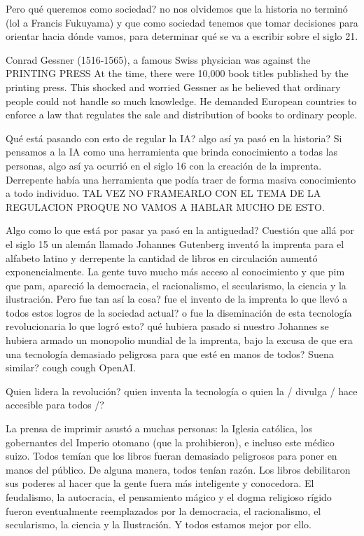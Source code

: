 Pero qué queremos como sociedad? no nos olvidemos que la historia no terminó (lol a Francis Fukuyama) y que como sociedad
tenemos que tomar decisiones para orientar hacia dónde vamos, para determinar qué se va a escribir sobre el siglo 21. 

Conrad Gessner (1516-1565), a famous Swiss physician was against the PRINTING PRESS At the time, there were 10,000 book titles published by the printing press.
This shocked and worried Gessner as he believed that ordinary people could not handle so much knowledge. 
He demanded European countries to enforce a law that regulates the sale and distribution of books to ordinary people. 


Qué está pasando con esto de regular la IA? algo así ya pasó en la historia?
Si pensamos a la IA como una herramienta que brinda conocimiento a todas las personas, algo así ya ocurrió en el siglo 16 con la 
creación de la imprenta. Derrepente había una herramienta que podía traer de forma masiva conocimiento a todo individuo. 
TAL VEZ NO FRAMEARLO CON EL TEMA DE LA REGULACION PROQUE NO VAMOS A HABLAR MUCHO DE ESTO. 

Algo como lo que está por pasar ya pasó en la antiguedad?
Cuestión que allá por el siglo 15 un alemán llamado Johannes Gutenberg inventó la imprenta para el alfabeto latino y derrepente la cantidad de libros
en circulación aumentó exponencialmente. La gente tuvo mucho más acceso al conocimiento y que pim que pam, 
apareció la democracia, el racionalismo, el secularismo, la ciencia y la ilustración. 
Pero fue tan así la cosa? fue el invento de la imprenta lo que llevó a todos estos logros de la sociedad actual?
o fue la diseminación de esta tecnología revolucionaria lo que logró esto? qué hubiera pasado si nuestro Johannes
se hubiera armado un monopolio mundial de la imprenta, bajo la excusa de que era una tecnología demasiado peligrosa
para que esté en manos de todos?
Suena similar? cough cough OpenAI. 


Quien lidera la revolución? quien inventa la tecnología o quien la / divulga / hace accesible para todos /?



La prensa de imprimir asustó a muchas personas: la Iglesia católica, los gobernantes del Imperio otomano (que la prohibieron), e incluso este médico suizo.
Todos temían que los libros fueran demasiado peligrosos para poner en manos del público.
De alguna manera, todos tenían razón.
Los libros debilitaron sus poderes al hacer que la gente fuera más inteligente y conocedora.
El feudalismo, la autocracia, el pensamiento mágico y el dogma religioso rígido fueron eventualmente reemplazados por la democracia, el racionalismo, el secularismo, la ciencia y la Ilustración.
Y todos estamos mejor por ello.



